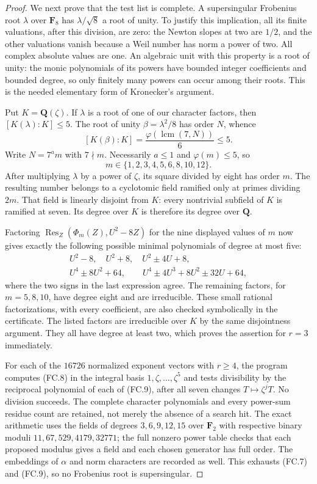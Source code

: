 \begin{proof}
We next prove that the test list is complete. A supersingular
Frobenius root $\lambda$ over $\mathbf F _8$ has
$\lambda/\sqrt8$ a root of unity. To justify this implication,
all its finite valuations, after this division, are zero: the
Newton slopes at two are $1/2$, and the other valuations vanish
because a Weil number has norm a power of two. All complex
absolute values are one. An algebraic unit with this property is
a root of unity: the monic polynomials of its powers have bounded
integer coefficients and bounded degree, so only finitely many
powers can occur among their roots. This is the needed elementary
form of Kronecker's argument.

Put $K=\mathbf Q(\zeta)$. If $\lambda$ is a root of one of our
character factors, then $[K(\lambda):K]\le5$. The root of unity
$\beta=\lambda^2/8$ has order $N$, whence
\[
 [K(\beta):K]=\frac{\varphi(\operatorname{lcm}(7,N))}{6}\le5.
\]
Write $N=7^a m$ with $7\nmid m$. Necessarily $a\le1$ and
$\varphi(m)\le5$, so
\[
                 m\in\{1,2,3,4,5,6,8,10,12\}.
\]
After multiplying $\lambda$ by a power of $\zeta$, its square
divided by eight has order $m$. The resulting number belongs to
a cyclotomic field ramified only at primes dividing $2m$. That
field is linearly disjoint from $K$: every nontrivial subfield of
$K$ is ramified at seven. Its degree over $K$ is therefore its
degree over $\mathbf Q$.

Factoring
$\operatorname{Res}_Z(\Phi_m(Z),U^2-8Z)$ for the nine displayed
values of $m$ now gives exactly the following possible minimal
polynomials of degree at most five:
\[
\begin{gathered}
 U^2-8,\quad U^2+8,\quad U^2\pm4U+8,\\
 U^4\pm8U^2+64,\qquad
 U^4\pm4U^3+8U^2\pm32U+64,
\end{gathered}                                                \tag{FC.9}
\]
where the two signs in the last expression agree. The remaining
factors, for $m=5,8,10$, have degree eight and are irreducible.
These small rational factorizations, with every coefficient, are
also checked symbolically in the certificate. The listed factors
are irreducible over $K$ by the same disjointness argument.
They all have degree at least two, which proves the assertion for
$r=3$ immediately.

For each of the $16726$ normalized exponent vectors with $r\ge4$,
the program computes (FC.8) in the integral basis
$1,\zeta,\ldots,\zeta^5$ and tests divisibility by the reciprocal
polynomial of each of (FC.9), after all seven changes
$T\mapsto\zeta^jT$. No division succeeds. The complete character
polynomials and every power-sum residue count are retained, not
merely the absence of a search hit. The exact arithmetic uses the
fields of degrees $3,6,9,12,15$ over $\mathbf F _2$ with respective
binary moduli $11,67,529,4179,32771$; the full nonzero power table
checks that each proposed modulus gives a field and each chosen
generator has full order. The embeddings of $\alpha$ and norm
characters are recorded as well. This exhausts (FC.7) and (FC.9),
so no Frobenius root is supersingular.


\end{proof}
